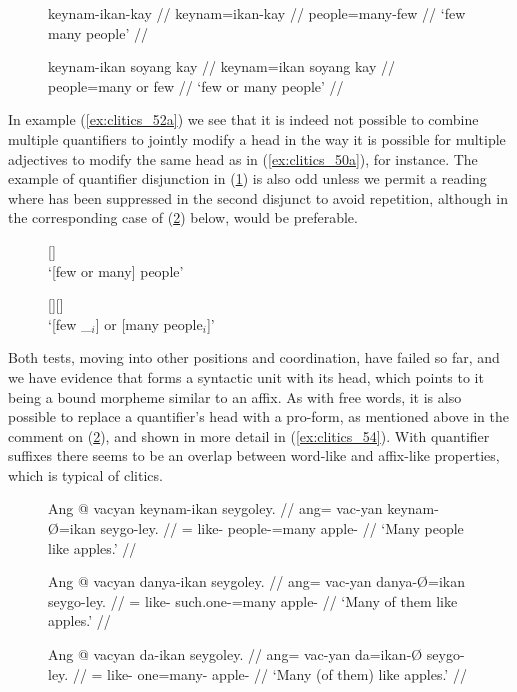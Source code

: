 \begin{figure}[h]
\pex\label{ex:clitics_52}
\a\label{ex:clitics_52a}\ljudge{*}\begingl
	\gla keynam-ikan-kay //
	\glb keynam=ikan-kay //
	\glc people=many-few //
	\glft `few many people' //
\endgl

\a\label{ex:clitics_52b}\ljudge{\ques}\begingl
	\gla keynam-ikan soyang kay //
	\glb keynam=ikan soyang kay //
	\glc people=many or few //
	\glft `few or many people' //
\endgl
\xe
\end{figure}

In example (\ref{ex:clitics_52a}) we see that it is indeed not possible to
combine multiple quantifiers to jointly modify a head in the way it is possible
for multiple adjectives to modify the same head as in (\ref{ex:clitics_50a}),
for instance. The example of quantifier disjunction in (\ref{ex:clitics_52b})
is also odd unless we permit a reading where
 has been suppressed in the second disjunct to
avoid repetition, although in the corresponding case of (\ref{ex:clitics_53b})
below,  would be preferable.

\begin{figure}[h]
\pex\label{ex:clitics_53}
\a\label{ex:clitics_53a}
	\ljudge{\ques\ques} [] \\
		`[few or many] people'

\a\label{ex:clitics_53b}
	\ljudge{\ques} [][]	\\
		`[few \_$_i$] or [many people$_i$]'
\xe
\end{figure}

Both tests, moving  into other positions
and coordination, have failed so far, and we have evidence that
 forms a syntactic unit with its head, which points to it
being a bound morpheme similar to an affix. As with free words, it is also
possible to replace a quantifier's head with a pro-form, as mentioned above in
the comment on (\ref{ex:clitics_53b}), and shown in more detail in
(\ref{ex:clitics_54}). With quantifier suffixes there seems to be an overlap
between word-like and affix-like properties, which is typical of clitics.

\begin{figure}[h]
\pex\label{ex:clitics_54}
\a\label{ex:clitics_54a}\begingl
	\gla Ang @ vacyan keynam-ikan seygoley. //
	\glb ang= vac-yan keynam-Ø=ikan seygo-ley. //
	\glc \AgtT{}= like-\TplM{} people-\Top{}=many apple-\PargI{} //
	\glft `Many people like apples.' //
\endgl

\a\label{ex:clitics_54b}\begingl
	\gla Ang @ vacyan danya-ikan seygoley. //
	\glb ang= vac-yan danya-Ø=ikan seygo-ley. //
	\glc \AgtT{}= like-\TplM{} such.one-\Top{}=many apple-\PargI{} //
	\glft `Many of them like apples.' //
\endgl

\a\label{ex:clitics_54c}\begingl
	\gla Ang @ vacyan da-ikan seygoley. //
	\glb ang= vac-yan da=ikan-Ø seygo-ley. //
	\glc \AgtT{}= like-\TplM{} one=many-\Top{} apple-\PargI{} //
	\glft `Many (of them) like apples.' //
\endgl
\xe
\end{figure}

